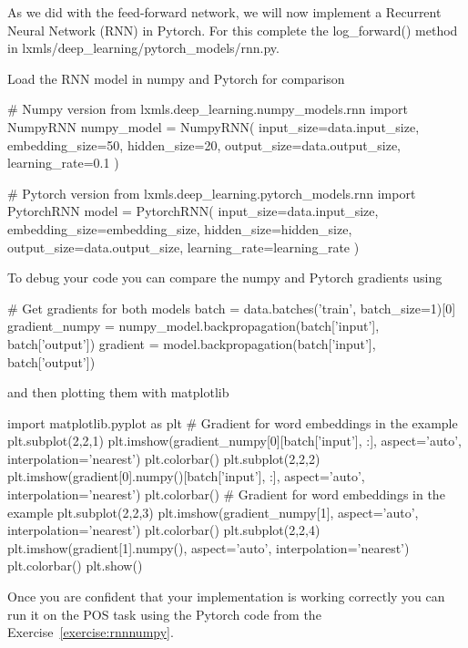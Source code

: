 \begin{exercise}
As we did with the feed-forward network, we will now implement a
Recurrent Neural Network (RNN) in Pytorch. For this complete the
log\_forward() method in lxmls/deep\_learning/pytorch\_models/rnn.py.

\noindent Load the RNN model in numpy and Pytorch for comparison
\begin{python}
# Numpy version
from lxmls.deep_learning.numpy_models.rnn import NumpyRNN
numpy_model = NumpyRNN(
    input_size=data.input_size,
    embedding_size=50,
    hidden_size=20,
    output_size=data.output_size,
    learning_rate=0.1
)

# Pytorch version
from lxmls.deep_learning.pytorch_models.rnn import PytorchRNN
model = PytorchRNN(
    input_size=data.input_size,
    embedding_size=embedding_size,
    hidden_size=hidden_size,
    output_size=data.output_size,
    learning_rate=learning_rate
)
\end{python}
\noindent To debug your code you can compare the numpy and Pytorch gradients using
\begin{python}
# Get gradients for both models
batch = data.batches('train', batch_size=1)[0]
gradient_numpy = numpy_model.backpropagation(batch['input'], batch['output'])
gradient = model.backpropagation(batch['input'], batch['output'])
\end{python}
\noindent and then plotting them with matplotlib
\begin{python}
import matplotlib.pyplot as plt
# Gradient for  word embeddings in the example
plt.subplot(2,2,1)
plt.imshow(gradient_numpy[0][batch['input'], :], aspect='auto', interpolation='nearest')
plt.colorbar()
plt.subplot(2,2,2)
plt.imshow(gradient[0].numpy()[batch['input'], :], aspect='auto', interpolation='nearest')
plt.colorbar()
# Gradient for  word embeddings in the example
plt.subplot(2,2,3)
plt.imshow(gradient_numpy[1], aspect='auto', interpolation='nearest')
plt.colorbar()
plt.subplot(2,2,4)
plt.imshow(gradient[1].numpy(), aspect='auto', interpolation='nearest')
plt.colorbar()
plt.show()
\end{python}
Once you are confident that your implementation is working correctly you can run it on the POS task using the Pytorch code from the Exercise~\ref{exercise:rnnnumpy}. 
\end{exercise}


